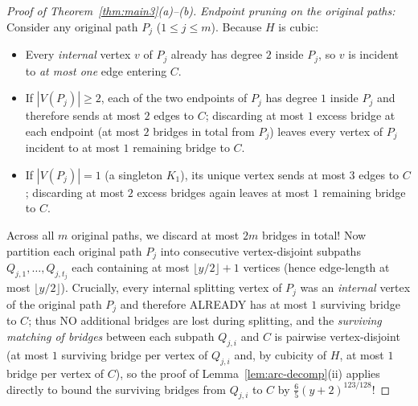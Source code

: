 \documentclass[11pt,reqno]{amsart}
\theoremstyle{plain}
\theoremstyle{definition}
\theoremstyle{remark}
\DeclareRobustCommand{\_}{\ifmmode\text{\textunderscore}\else\textunderscore\allowbreak\fi}
\begin{document}
\begin{proof}[Proof of Theorem~\ref{thm:main3}(a)--(b)]
\emph{Endpoint pruning on the original paths:} Consider any original path $P_j$ ($1 \le j \le m$). Because $H$ is cubic:
\begin{itemize}[leftmargin=1.6em]
  \item Every \emph{internal} vertex $v$ of $P_j$ already has degree $2$ inside $P_j$, so $v$ is incident to \emph{at most one} edge entering $C$.
  \item If $|V(P_j)| \ge 2$, each of the two endpoints of $P_j$ has degree $1$ inside $P_j$ and therefore sends at most $2$ edges to $C$; discarding at most $1$ excess bridge at each endpoint (at most $2$ bridges in total from $P_j$) leaves every vertex of $P_j$ incident to at most $1$ remaining bridge to $C$.
  \item If $|V(P_j)| = 1$ (a singleton $K_1$), its unique vertex sends at most $3$ edges to $C$; discarding at most $2$ excess bridges again leaves at most $1$ remaining bridge to $C$.
\end{itemize}
Across all $m$ original paths, we discard at most $2m$ bridges in total! Now partition each original path $P_j$ into consecutive vertex-disjoint subpaths $Q_{j, 1}, \dots, Q_{j, t_j}$ each containing at most $\lfloor y/2 \rfloor + 1$ vertices (hence edge-length at most $\lfloor y/2 \rfloor$). Crucially, every internal splitting vertex of $P_j$ was an \emph{internal} vertex of the original path $P_j$ and therefore ALREADY has at most $1$ surviving bridge to $C$; thus NO additional bridges are lost during splitting, and the \emph{surviving matching of bridges} between each subpath $Q_{j, i}$ and $C$ is pairwise vertex-disjoint (at most $1$ surviving bridge per vertex of $Q_{j, i}$ and, by cubicity of $H$, at most $1$ bridge per vertex of $C$), so the proof of Lemma~\ref{lem:arc-decomp}(ii) applies directly to bound the surviving bridges from $Q_{j, i}$ to $C$ by $\frac{6}{5}(y + 2)^{123/128}$!


\end{proof}
\end{document}
